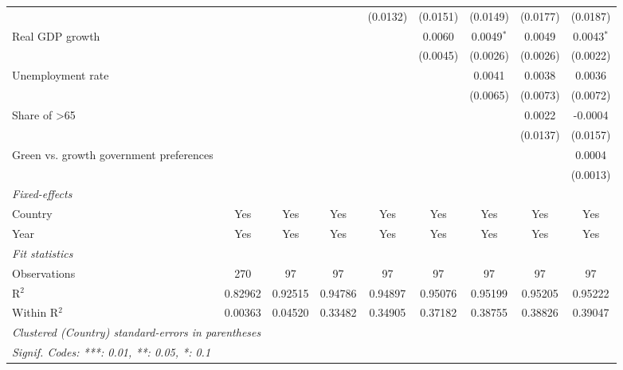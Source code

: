 \begin{table}[htbp]
\begin{tabular}{lcccccccc}
                                              &          &          &              & (0.0132)     & (0.0151)     & (0.0149)     & (0.0177)     & (0.0187)\\   
      Real GDP growth                         &          &          &              &              & 0.0060       & 0.0049$^{*}$ & 0.0049       & 0.0043$^{*}$\\   
                                              &          &          &              &              & (0.0045)     & (0.0026)     & (0.0026)     & (0.0022)\\   
      Unemployment rate                       &          &          &              &              &              & 0.0041       & 0.0038       & 0.0036\\   
                                              &          &          &              &              &              & (0.0065)     & (0.0073)     & (0.0072)\\   
      Share of >65                            &          &          &              &              &              &              & 0.0022       & -0.0004\\   
                                              &          &          &              &              &              &              & (0.0137)     & (0.0157)\\   
      Green vs. growth government preferences &          &          &              &              &              &              &              & 0.0004\\   
                                              &          &          &              &              &              &              &              & (0.0013)\\   
      \midrule
      \emph{Fixed-effects}\\
      Country                                 & Yes      & Yes      & Yes          & Yes          & Yes          & Yes          & Yes          & Yes\\  
      Year                                    & Yes      & Yes      & Yes          & Yes          & Yes          & Yes          & Yes          & Yes\\  
      \midrule
      \emph{Fit statistics}\\
      Observations                            & 270      & 97       & 97           & 97           & 97           & 97           & 97           & 97\\  
      R$^2$                                   & 0.82962  & 0.92515  & 0.94786      & 0.94897      & 0.95076      & 0.95199      & 0.95205      & 0.95222\\  
      Within R$^2$                            & 0.00363  & 0.04520  & 0.33482      & 0.34905      & 0.37182      & 0.38755      & 0.38826      & 0.39047\\  
      \midrule \midrule
      \multicolumn{9}{l}{\emph{Clustered (Country) standard-errors in parentheses}}\\
      \multicolumn{9}{l}{\emph{Signif. Codes: ***: 0.01, **: 0.05, *: 0.1}}\\
   \end{tabular}
\end{table}


